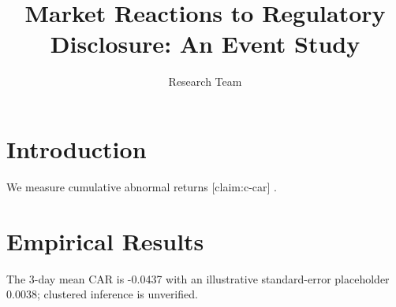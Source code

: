 \documentclass{article}
\newcommand{\result}[2]{#2}
\begin{document}
\title{Market Reactions to Regulatory Disclosure: An Event Study}
\author{Research Team}
\maketitle
\section{Introduction}
We measure cumulative abnormal returns [claim:c-car] \cite{fama1969}.
\section{Empirical Results}
The 3-day mean CAR is \result{primary.car_mean}{-0.0437}
with an illustrative standard-error placeholder \result{primary.std_error}{0.0038}; clustered inference is unverified.
\par\medskip\noindent


\end{document}
